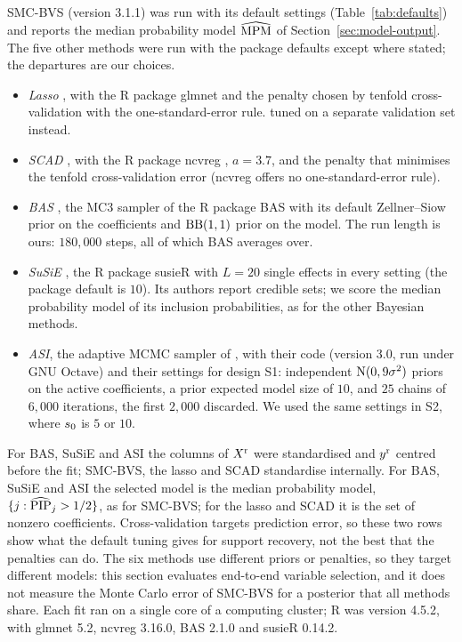 SMC-BVS (version 3.1.1) was run with its default settings (Table~\ref{tab:defaults}) and reports the median
probability model $\widehat{\mathrm{MPM}}$ of Section~\ref{sec:model-output}. The five other methods were run with the package
defaults except where stated; the departures are our choices.
\begin{itemize}
  \item \emph{Lasso} \citep{Tibshirani1996}, with the R package glmnet \citep{FriedmanHastieTibshirani2010} and the
  penalty chosen by tenfold cross-validation with the one-standard-error rule. \citet{HastieTibshiraniTibshirani2020}
  tuned on a separate validation set instead.
  \item \emph{SCAD} \citep{FanLi2001}, with the R package ncvreg \citep{BrehenyHuang2011}, $a=3.7$, and the penalty
  that minimises the tenfold cross-validation error (ncvreg offers no one-standard-error rule).
  \item \emph{BAS} \citep{ClydeGhoshLittman2011}, the MC3 sampler \citep{RafteryMadiganHoeting1997} of the R package
  BAS with its default Zellner--Siow prior on the coefficients \citep{ZellnerSiow1980} and $\mathrm{BB}(1,1)$ prior on the
  model. The run length is ours: $180{,}000$ steps, all of which BAS averages over.
  \item \emph{SuSiE} \citep{WangSarkarCarbonettoStephens2020}, the R package susieR with $L=20$ single effects in
  every setting (the package default is $10$). Its authors report credible sets; we score the median probability
  model of its inclusion probabilities, as for the other Bayesian methods.
  \item \emph{ASI}, the adaptive MCMC sampler of \citet{GriffinLatuszynskiSteel2021}, with their code (version 3.0,
  run under GNU Octave) and their settings for design S1: independent $\mathrm{N}(0,9\sigma^2)$ priors on the active
  coefficients, a prior expected model size of $10$, and $25$ chains of $6{,}000$ iterations, the first $2{,}000$
  discarded. We used the same settings in S2, where $s_0$ is $5$ or $10$.
\end{itemize}
For BAS, SuSiE and ASI the columns of $X^{\mathrm r}$ were standardised and $y^{\mathrm r}$ centred before the fit; SMC-BVS, the lasso
and SCAD standardise internally. For BAS, SuSiE and ASI the selected model is the median probability model,
$\{j:\widehat{\mathrm{PIP}}_j>1/2\}$, as for SMC-BVS; for the lasso and SCAD it is the set of nonzero coefficients. Cross-validation
targets prediction error, so these two rows show what the default tuning gives for support recovery, not the best
that the penalties can do. The six methods use different priors or penalties, so they target different models: this
section evaluates end-to-end variable selection, and it does not measure the Monte Carlo error of SMC-BVS for a
posterior that all methods share. Each fit ran on a single core of a computing cluster; R was version 4.5.2, with
glmnet 5.2, ncvreg 3.16.0, BAS 2.1.0 and susieR 0.14.2.

